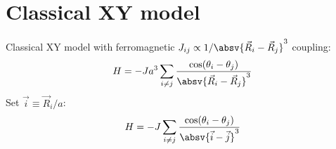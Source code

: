 \chapter{Classical XY model}
\label{xy_model}

\newcommand{\Raij}{\absv{\vec{R}_i-\vec{R}_j}^3}
\newcommand{\aij}{\absv{\vec{i}-\vec{j}}^3}
\newcommand{\suminj}{\sum_{i\ne j}}


Classical XY model with ferromagnetic $J_{ij} \propto 1/\Raij$ coupling:
\begin{align}
H=-J a^3 \sum_{i\ne j} \frac{\cos(\theta_i - \theta_j)}{\Raij}
\end{align}
Set $\vec{i}\equiv \vec{R}_i/a$:
\begin{align}
H=-J \sum_{i\ne j} \frac{\cos(\theta_i - \theta_j)}{\aij}
\end{align}

